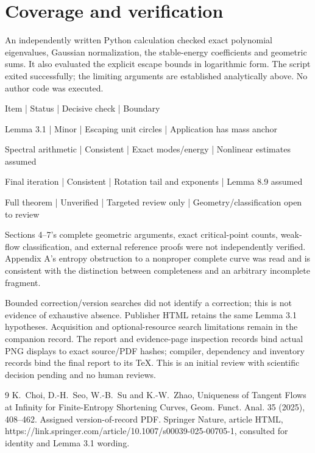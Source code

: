\documentclass[10pt]{article}
\begin{document}
\section*{Coverage and verification}
An independently written Python calculation checked exact polynomial eigenvalues, Gaussian normalization, the stable-energy coefficients and geometric sums. It also evaluated the explicit escape bounds in logarithmic form. The script exited successfully; the limiting arguments are established analytically above. No author code was executed.\par
Item | Status | Decisive check | Boundary\par
Lemma 3.1 | Minor | Escaping unit circles | Application has mass anchor\par
Spectral arithmetic | Consistent | Exact modes/energy | Nonlinear estimates assumed\par
Final iteration | Consistent | Rotation tail and exponents | Lemma 8.9 assumed\par
Full theorem | Unverified | Targeted review only | Geometry/classification open to review\par
Sections 4–7’s complete geometric arguments, exact critical-point counts, weak-flow classification, and external reference proofs were not independently verified. Appendix A’s entropy obstruction to a nonproper complete curve was read and is consistent with the distinction between completeness and an arbitrary incomplete fragment.\par
Bounded correction/version searches did not identify a correction; this is not evidence of exhaustive absence. Publisher HTML retains the same Lemma 3.1 hypotheses. Acquisition and optional-resource search limitations remain in the companion record. The report and evidence-page inspection records bind actual PNG displays to exact source/PDF hashes; compiler, dependency and inventory records bind the final report to its TeX. This is an initial review with scientific decision pending and no human reviews.\par
9 K. Choi, D.-H. Seo, W.-B. Su and K.-W. Zhao, Uniqueness of Tangent Flows at Infinity for Finite-Entropy Shortening Curves, Geom. Funct. Anal. 35 (2025), 408–462. Assigned version-of-record PDF. Springer Nature, article HTML, https://link.springer.com/article/10.1007/s00039-025-00705-1, consulted for identity and Lemma 3.1 wording.\par
\end{document}
